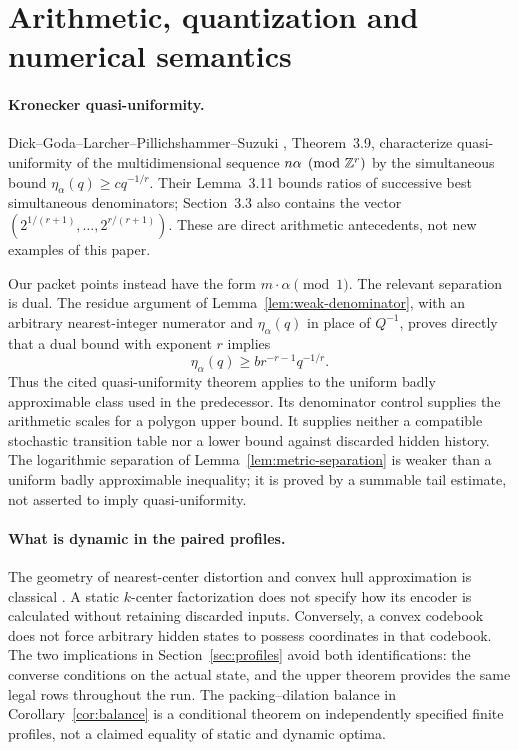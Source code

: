 \section{Arithmetic, quantization and numerical semantics}\label{sec:comparison}
\paragraph{Kronecker quasi-uniformity.}
Dick--Goda--Larcher--Pillichshammer--Suzuki \cite{DGLPS}, Theorem~3.9, characterize quasi-uniformity of the multidimensional sequence $n\alpha\pmod{\mathbb Z^r}$ by the simultaneous bound $\eta_\alpha(q)\ge c q^{-1/r}$. Their Lemma~3.11 bounds ratios of successive best simultaneous denominators; Section~3.3 also contains the vector $(2^{1/(r+1)},\ldots,2^{r/(r+1)})$. These are direct arithmetic antecedents, not new examples of this paper.

Our packet points instead have the form $m\cdot\alpha\pmod1$. The relevant separation is dual. The residue argument of Lemma~\ref{lem:weak-denominator}, with an arbitrary nearest-integer numerator and $\eta_\alpha(q)$ in place of $Q^{-1}$, proves directly that a dual bound with exponent $r$ implies
\[
             \eta_\alpha(q)\ge b r^{-r-1}q^{-1/r}.
\]
Thus the cited quasi-uniformity theorem applies to the uniform badly approximable class used in the predecessor. Its denominator control supplies the arithmetic scales for a polygon upper bound. It supplies neither a compatible stochastic transition table nor a lower bound against discarded hidden history. The logarithmic separation of Lemma~\ref{lem:metric-separation} is weaker than a uniform badly approximable inequality; it is proved by a summable tail estimate, not asserted to imply quasi-uniformity.

\paragraph{What is dynamic in the paired profiles.}
The geometry of nearest-center distortion and convex hull approximation is classical \cite{GL,Vidyasagar}. A static $k$-center factorization does not specify how its encoder is calculated without retaining discarded inputs. Conversely, a convex codebook does not force arbitrary hidden states to possess coordinates in that codebook. The two implications in Section~\ref{sec:profiles} avoid both identifications: the converse conditions on the actual state, and the upper theorem provides the same legal rows throughout the run. The packing--dilation balance in Corollary~\ref{cor:balance} is a conditional theorem on independently specified finite profiles, not a claimed equality of static and dynamic optima.

